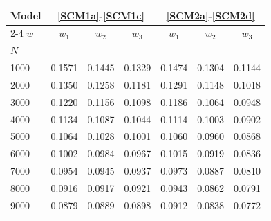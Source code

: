\begin{tabular*}{\textwidth}{@{\extracolsep\fill}lcccccc@{}}
\toprule
\textbf{Model} & \multicolumn{3}{c}{\textbf{\eqref{SCM1a}}-\textbf{\eqref{SCM1c}}} & \multicolumn{3}{c}{\textbf{\eqref{SCM2a}}-\textbf{\eqref{SCM2d}}} \\
\cmidrule{2-4} \cmidrule{5-7}
\textbf{$w$} & \textbf{$w_1$} & \textbf{$w_2$} & \textbf{$w_3$} & \textbf{$w_1$} & \textbf{$w_2$} & \textbf{$w_3$} \\
\midrule
$N$ & & & & & & \\
1000 & 0.1571 & 0.1445 & 0.1329 & 0.1474 & 0.1304 & 0.1144 \\
2000 & 0.1350 & 0.1258 & 0.1181 & 0.1291 & 0.1148 & 0.1018 \\
3000 & 0.1220 & 0.1156 & 0.1098 & 0.1186 & 0.1064 & 0.0948 \\
4000 & 0.1134 & 0.1087 & 0.1044 & 0.1114 & 0.1003 & 0.0902 \\
5000 & 0.1064 & 0.1028 & 0.1001 & 0.1060 & 0.0960 & 0.0868 \\
6000 & 0.1002 & 0.0984 & 0.0967 & 0.1015 & 0.0919 & 0.0836 \\
7000 & 0.0954 & 0.0945 & 0.0937 & 0.0973 & 0.0887 & 0.0810 \\
8000 & 0.0916 & 0.0917 & 0.0921 & 0.0943 & 0.0862 & 0.0791 \\
9000 & 0.0879 & 0.0889 & 0.0898 & 0.0912 & 0.0838 & 0.0772 \\
\bottomrule
\end{tabular*}
